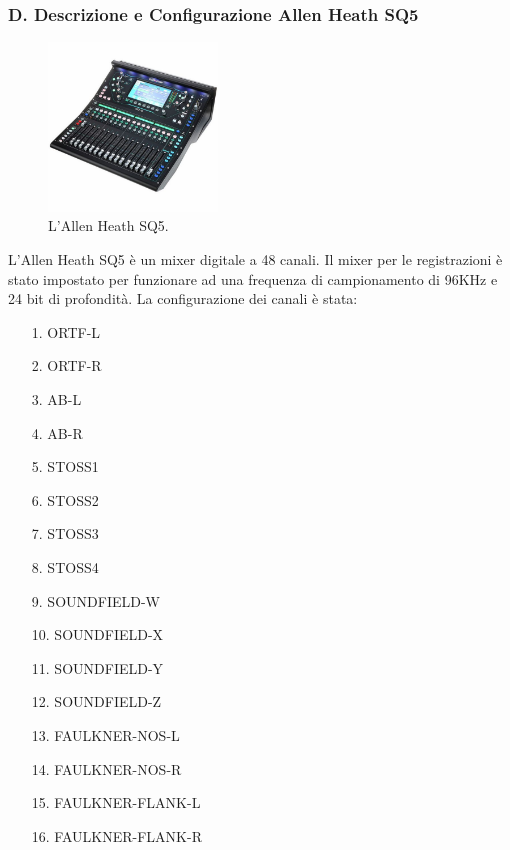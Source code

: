 \documentclass{article}
\begin{document}
\subsubsection{D. Descrizione e Configurazione Allen Heath SQ5}
    \begin{figure}[H]
        \centering
        \includegraphics[width=0.4\textwidth]{images/SQ5.jpg}
        \caption{\label{fig7}L'Allen Heath SQ5.}
    \end{figure}
    
    L'Allen Heath SQ5 è un mixer digitale a 48 canali. Il mixer per le registrazioni è stato impostato per funzionare ad una frequenza di campionamento di 96KHz e 24 bit di profondità.
    La configurazione dei canali è stata:
    \begin{itemize}
        \item[1.] ORTF-L
        \item[2.] ORTF-R
        \item[3.] AB-L
        \item[4.] AB-R
        \item[5.] STOSS1
        \item[6.] STOSS2
        \item[7.] STOSS3
        \item[8.] STOSS4
        \item[9.] SOUNDFIELD-W
        \item[10.] SOUNDFIELD-X
        \item[11.] SOUNDFIELD-Y
        \item[12.] SOUNDFIELD-Z
        \item[13.] FAULKNER-NOS-L
        \item[14.] FAULKNER-NOS-R
        \item[15.] FAULKNER-FLANK-L
        \item[16.] FAULKNER-FLANK-R
    \end{itemize}
\end{document}
